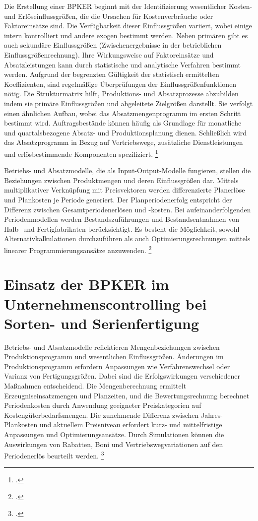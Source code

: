 Die Erstellung einer BPKER beginnt mit der Identifizierung wesentlicher Kosten- und Erlöseinflussgrö{\ss}en, die die Ursachen für Kostenverbräuche oder Faktoreinsätze sind. Die Verfügbarkeit dieser Einflussgrö{\ss}en variiert, wobei einige intern kontrolliert und andere exogen bestimmt werden. Neben primären gibt es auch sekundäre Einflussgrö{\ss}en (Zwischenergebnisse in der betrieblichen Einflussgrö{\ss}enrechnung). Ihre Wirkungsweise auf Faktoreinsätze und Absatzleistungen kann durch statistische und analytische Verfahren bestimmt werden. Aufgrund der begrenzten Gültigkeit der statistisch ermittelten Koeffizienten, sind regelmä{\ss}ige Überprüfungen der Einflussgrö{\ss}enfunktionen nötig. Die Strukturmatrix hilft, Produktions- und Absatzprozesse abzubilden indem sie primäre Einflussgrö{\ss}en und abgeleitete Zielgrö{\ss}en darstellt. Sie verfolgt einen ähnlichen Aufbau, wobei das Absatzmengenprogramm im ersten Schritt bestimmt wird. Auftragsbestände können häufig als Grundlage für monatliche und quartalsbezogene Absatz- und Produktionsplanung dienen. Schlie{\ss}lich wird das Absatzprogramm in Bezug auf Vertriebswege, zusätzliche Dienstleistungen und erlösbestimmende Komponenten spezifiziert. \footcite[Vgl.][]{noauthor_betriebsplankostenrechnung_2023}

Betriebs- und Absatzmodelle, die als Input-Output-Modelle fungieren, stellen die Beziehungen zwischen Produktmengen und deren Einflussgrö{\ss}en dar. Mittels multiplikativer Verknüpfung mit Preisvektoren werden differenzierte Planerlöse und Plankosten je Periode generiert. Der Planperiodenerfolg entspricht der Differenz zwischen Gesamtperiodenerlösen und -kosten. Bei aufeinanderfolgenden Periodenmodellen werden Bestandszuführungen und Bestandsentnahmen von Halb- und Fertigfabrikaten berücksichtigt. Es besteht die Möglichkeit, sowohl Alternativkalkulationen durchzuführen als auch Optimierungsrechnungen mittels linearer Programmierungsansätze anzuwenden. \footcite[Vgl.][S. 302]{noauthor_betriebsplankostenrechnung_2023}

\section{Einsatz der BPKER im Unternehmenscontrolling bei Sorten- und Serienfertigung}

Betriebs- und Absatzmodelle reflektieren Mengenbeziehungen zwischen Produktionsprogramm und wesentlichen Einflussgrö{\ss}en. Änderungen im Produktionsprogramm erfordern Anpassungen wie Verfahrenswechsel oder Varianz von Fertigungsgrö{\ss}en. Dabei sind die Erfolgswirkungen verschiedener Ma{\ss}nahmen entscheidend. Die Mengenberechnung ermittelt Erzeugniseinsatzmengen und Planzeiten, und die Bewertungsrechnung berechnet Periodenkosten durch Anwendung geeigneter Preiskategorien auf Kostengüterbedarfsmengen. Die zunehmende Differenz zwischen Jahres-Plankosten und aktuellem Preisniveau erfordert kurz- und mittelfristige Anpassungen und Optimierungsansätze. Durch Simulationen können die Auswirkungen von Rabatten, Boni und Vertriebswegvariationen auf den Periodenerlös beurteilt werden. \footcite[Vgl.][S. 303ff]{Artikel_orginal}

